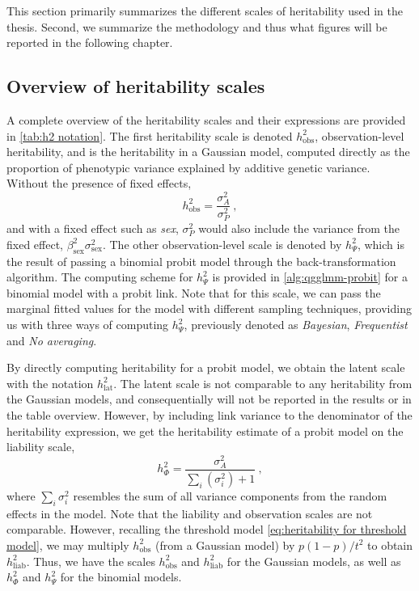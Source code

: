 This section primarily summarizes the different scales of heritability used in the thesis. Second, we summarize the methodology and thus what figures will be reported in the following chapter.

\subsection{Overview of heritability scales}
A complete overview of the heritability scales and their expressions are provided in \autoref{tab:h2 notation}. The first heritability scale is denoted $h^2_\text{obs}$, observation-level heritability, and is the heritability in a Gaussian model, computed directly as the proportion of phenotypic variance explained by additive genetic variance. Without the presence of fixed effects,
\begin{equation*}
    h^2_\text{obs} = \frac{\sigma^2_A}{\sigma^2_P} \ ,
\end{equation*}
and with a fixed effect such as \textit{sex}, $\sigma^2_P$ would also include the variance from the fixed effect, $\beta_\text{sex}^2\sigma^2_\text{sex}$. The other observation-level scale is denoted by $h^2_\Psi$, which is the result of passing a binomial probit model through the back-transformation algorithm. The computing scheme for $h^2_\Psi$ is provided in \autoref{alg:qgglmm-probit} for a binomial model with a probit link. Note that for this scale, we can pass the marginal fitted values for the model with different sampling techniques, providing us with three ways of computing $h^2_\Psi$, previously denoted as \textit{Bayesian}, \textit{Frequentist} and \textit{No averaging}.

By directly computing heritability for a probit model, we obtain the latent scale with the notation $h^2_\text{lat}$. The latent scale is not comparable to any heritability from the Gaussian models, and consequentially will not be reported in the results or in the table overview. However, by including link variance to the denominator of the heritability expression, we get the heritability estimate of a probit model on the liability scale, 
\begin{equation*}
    h^2_\Phi = \frac{\sigma^2_A}{\sum_i(\sigma^2_i) + 1} \ ,
\end{equation*}
where $\sum_i \sigma^2_i$ resembles the sum of all variance components from the random effects in the model. Note that the liability and observation scales are not comparable. However, recalling the threshold model \eqref{eq:heritability for threshold model}, we may multiply $h^2_\text{obs}$ (from a Gaussian model) by $p(1-p)/t^2$ to obtain $h^2_\text{liab}$. Thus, we have the scales $h^2_\text{obs}$ and $h^2_\text{liab}$ for the Gaussian models, as well as $h^2_\Phi$ and $h^2_\Psi$ for the binomial models.

